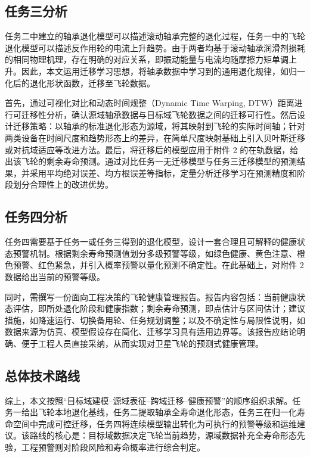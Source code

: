 \subsection{任务三分析}

任务二中建立的轴承退化模型可以描述滚动轴承完整的退化过程，任务一中的飞轮退化模型可以描述反作用轮的电流上升趋势。由于两者均基于滚动轴承润滑剂损耗的相同物理机理，存在明确的对应关系，即振动能量与电流均随摩擦力矩单调上升。因此，本文运用迁移学习思想，将轴承数据中学习到的通用退化规律，如归一化后的退化形状函数，迁移至飞轮数据。

首先，通过可视化对比和动态时间规整（Dynamic Time Warping, DTW）距离进行可迁移性分析，确认源域轴承数据与目标域飞轮数据之间的迁移可行性。然后设计迁移策略：以轴承的标准退化形态为源域，将其映射到飞轮的实际时间轴；针对两类设备在时间尺度和趋势形态上的差异，在简单尺度映射基础上引入贝叶斯迁移或对抗域适应等改进方法。最后，将迁移后的模型应用于附件 2 的在轨数据，给出该飞轮的剩余寿命预测。通过对比任务一无迁移模型与任务三迁移模型的预测结果，并采用平均绝对误差、均方根误差等指标，定量分析迁移学习在预测精度和阶段划分合理性上的改进优势。

\subsection{任务四分析}

任务四需要基于任务一或任务三得到的退化模型，设计一套合理且可解释的健康状态预警机制。根据剩余寿命预测值划分多级预警等级，如绿色健康、黄色注意、橙色预警、红色紧急，并引入概率预警以量化预测不确定性。在此基础上，对附件 2 数据给出当前的预警等级。

同时，需撰写一份面向工程决策的飞轮健康管理报告。报告内容包括：当前健康状态评估，即所处退化阶段和健康指数；剩余寿命预测，即点估计与区间估计；建议措施，如降速运行、切换备用轮、任务规划调整；以及不确定性与局限性说明，如数据来源为仿真、模型假设存在简化、迁移学习具有适用边界等。该报告应结论明确、便于工程人员直接采纳，从而实现对卫星飞轮的预测式健康管理。

\subsection{总体技术路线}

综上，本文按照“目标域建模--源域表征--跨域迁移--健康预警”的顺序组织求解。任务一给出飞轮本地退化基线，任务二提取轴承全寿命退化形态，任务三在归一化寿命空间中完成可控迁移，任务四将连续模型输出转化为可执行的预警等级和运维建议。该路线的核心是：目标域数据决定飞轮当前趋势，源域数据补充全寿命形态先验，工程预警则对阶段风险和寿命概率进行综合判定。

